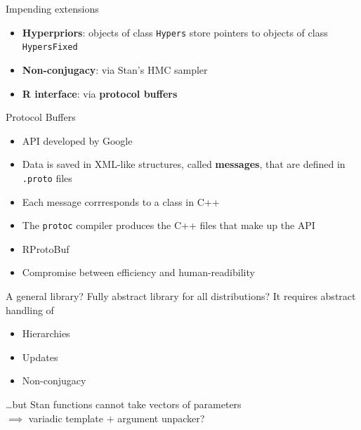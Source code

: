 \begin{frame}{Impending extensions}
	\begin{itemize}
	   \item \textbf{Hyperpriors}: objects of class \texttt{Hypers} store pointers to objects of class \texttt{HypersFixed} %
	   \item \textbf{Non-conjugacy}: via Stan's HMC sampler
	   \item  \textbf{R interface}: via \textbf{protocol buffers}
	\end{itemize}
\end{frame}

\begin{frame}{Protocol Buffers}
	\begin{itemize}
		\item API developed by Google
		\item Data is saved in XML-like structures, called \textbf{messages}, that are defined in \texttt{.proto} files
		\item Each message corrresponds to a class in C++
		\item The \texttt{protoc} compiler produces the C++ files that make up the API
		\item RProtoBuf
		\item Compromise between efficiency and human-readibility
	\end{itemize}
\end{frame}

\begin{frame}{A general library?}
	Fully abstract library for all distributions? It requires abstract handling of
	\begin{itemize}
		\item Hierarchies
		\item Updates
		\item Non-conjugacy
	\end{itemize}
	\vspace{10pt}
	\dots but Stan functions cannot take vectors of parameters \\
	$\implies$ variadic template $+$ argument unpacker?
\end{frame}


